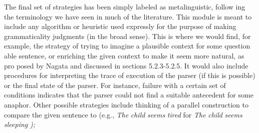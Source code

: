 \begin{styleTextbody}
The final set of strategies has been simply labeled as metalinguistic, follow\- ing the terminology we have seen in much of the literature. This module is meant to include any algorithm or heuristic used expressly for the purpose of making grammaticality judgments (in the broad sense). This is where we would find, for example, the strategy of trying to imagine a plausible context for some question\- able sentence, or enriching the given context to make it seem more natural, as pro\- posed by Nagata and discussed in sections 5.2.3-5.2.5. It would also include procedures for interpreting the trace of execution of the parser (if this is possible) or the final state of the parser. For instance, failure with a certain set of conditions indicates that the parser could not find a suitable antecedent for some anaphor. Other possible strategies include thinking of a parallel construction to compare the given sentence to (e.g., \textit{The}\textit{ }\textit{child}\textit{ }\textit{seems}\textit{ }\textit{tired}\textit{ }for \textit{The}\textit{ }\textit{child}\textit{ }\textit{seems}\textit{ }\textit{sleeping}\textit{ }\textit{);}
\end{styleTextbody}


